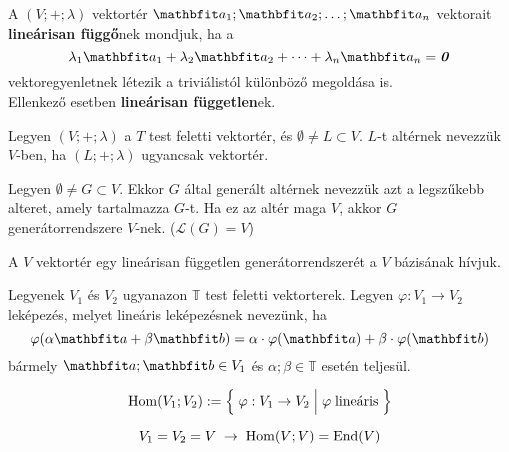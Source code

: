 \documentclass[lang=magyar]{math-handout}
\begin{document}
\begin{definition}
  A $(V; +; \lambda)$ vektortér $\rvec a_1; \rvec a_2; \dots; \rvec a_n$
  vektorait \textbf{lineárisan függő}nek mondjuk, ha a
  \[
    \lambda_1 \rvec a_1 +
    \lambda_2 \rvec a_2 +
    \dots +
    \lambda_n \rvec a_n =
    \nvec
  \]
  vektoregyenletnek létezik a triviálistól különböző megoldása is.
  \\[2mm]
  Ellenkező esetben \textbf{lineárisan független}ek.
\end{definition}

\begin{definition}[Altér]
  Legyen $(V; +; \lambda)$ a $T$ test feletti vektortér, és
  $\emptyset \neq L \subset V$. $L$-t altérnek nevezzük $V$-ben, ha
  $(L; +; \lambda)$ ugyancsak vektortér.
\end{definition}

\begin{definition}[Generátorrendszer]
  Legyen $\emptyset \neq G \subset V$. Ekkor $G$ által generált altérnek
  nevezzük azt a legszűkebb alteret, amely tartalmazza $G$-t. Ha ez az
  altér maga $V$, akkor $G$ generátorrendszere $V$-nek. ($\mathcal L(G)=V$)
\end{definition}

\begin{definition}[Bázis]
  A $V$ vektortér egy lineárisan független generátorrendszerét a $V$ bázisának
  hívjuk.
\end{definition}

\begin{definition}
  Legyenek $V_1$ és $V_2$ ugyanazon $\mathbb T$ test feletti vektorterek. Legyen
  $\varphi: V_1 \rightarrow V_2$ leképezés, melyet lineáris leképezésnek
  nevezünk, ha
  \[
    \varphi ( \alpha \rvec{a} + \beta \rvec{b} )
    = \alpha \cdot \varphi ( \rvec{a} )
    + \beta \cdot \varphi ( \rvec{b} )
  \]
  bármely $\rvec{a} ; \rvec{b} \in V_1$ és
  $\alpha; \beta \in \mathbb{T}$ esetén teljesül.
\end{definition}

\begin{definition}[Homomorfizmus]
  \vspace{-1em}
  \[
    \operatorname{Hom} ( V_1; V_2 ) :=
    \Big\{\; \varphi : V_1 \rightarrow V_2 \;\Big|\; \varphi \; \text{lineáris} \;\Big\}
  \]
\end{definition}

\begin{definition}[Endomorfizmus]
  \vspace{-1em}
  \[
    V_1 = V_2 = V \; \rightarrow \;
    \operatorname{Hom} ( V; V ) = \operatorname{End} (V)
  \]
\end{definition}
\end{document}
